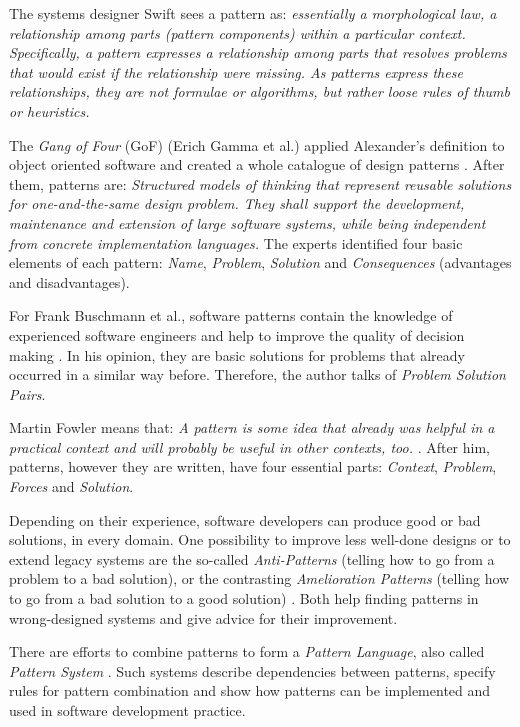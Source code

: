 The systems designer Swift \cite{designmatrix} sees a pattern as:
\textit{essentially a morphological law, a relationship among parts (pattern
components) within a particular context. Specifically, a pattern expresses a
relationship among parts that resolves problems that would exist if the
relationship were missing. As patterns express these relationships, they are
not formulae or algorithms, but rather loose rules of thumb or heuristics.}

The \emph{Gang of Four} (GoF) (Erich Gamma et al.) applied Alexander's
definition to object oriented software and created a whole catalogue of design
patterns \cite{gamma1995}. After them, patterns are: \textit{Structured models
of thinking that represent reusable solutions for one-and-the-same design
problem. They shall support the development, maintenance and extension of large
software systems, while being independent from concrete implementation
languages.} The experts identified four basic elements of each pattern:
\emph{Name}, \emph{Problem}, \emph{Solution} and \emph{Consequences}
(advantages and disadvantages).

For Frank Buschmann et al., software patterns contain the knowledge of
experienced software engineers and help to improve the quality of decision
making \cite{buschmann}. In his opinion, they are basic solutions for problems
that already occurred in a similar way before. Therefore, the author talks of
\emph{Problem Solution Pairs}.

Martin Fowler means that: \textit{A pattern is some idea that already was
helpful in a practical context and will probably be useful in other contexts,
too.} \cite{fowler1997}. After him, patterns, however they are written, have
four essential parts: \emph{Context}, \emph{Problem}, \emph{Forces} and
\emph{Solution}.

Depending on their experience, software developers can produce good or bad
solutions, in every domain. One possibility to improve less well-done designs or
to extend legacy systems are the so-called \emph{Anti-Patterns} (telling how to go
from a problem to a bad solution), or the contrasting \emph{Amelioration Patterns}
(telling how to go from a bad solution to a good solution) \cite{portland}.
Both help finding patterns in wrong-designed systems and give advice for their
improvement.

There are efforts to combine patterns to form a \emph{Pattern Language}, also
called \emph{Pattern System} \cite{buschmann}. Such systems describe
dependencies between patterns, specify rules for pattern combination and show
how patterns can be implemented and used in software development practice.


